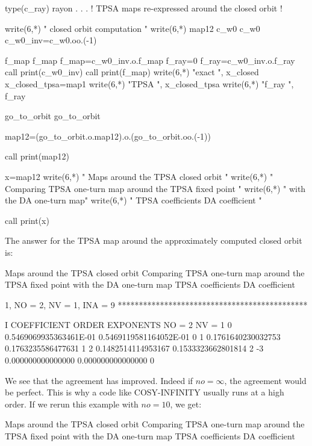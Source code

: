 \documentclass{hitec}     %
\begin{document}
{{{{{{\begin{code}
type(c_ray) rayon
      .
      .
      .
! TPSA maps re-expressed around the closed orbit !

write(6,*) " closed orbit computation "
write(6,*) map12%
c_w0%
c_w0%
c_w0_inv=c_w0.oo.(-1)

f_map%
f_map%
f_map=c_w0_inv.o.f_map
f_ray=0
f_ray=c_w0_inv.o.f_ray
call print(c_w0_inv)
call print(f_map)
write(6,*) "exact ", x_closed
x_closed_tpsa=map1%
write(6,*) "TPSA  ", x_closed_tpsa
write(6,*) "f_ray ", f_ray%

go_to_orbit%
go_to_orbit%

map12=(go_to_orbit.o.map12).o.(go_to_orbit.oo.(-1))

call print(map12)

x=map12%
 write(6,*)  "    Maps around the TPSA closed orbit "
 write(6,*)  "    Comparing TPSA one-turn map around the TPSA fixed point "
write(6,*)  "    with the DA one-turn map"
 write(6,*)  "    TPSA coefficients      DA coefficient "

 call print(x)
 \end{code}

The answer for the TPSA map around the approximately computed closed orbit is:

\begin{code}
      Maps around the TPSA closed orbit
     Comparing TPSA one-turn map around the TPSA fixed point
     with the DA one-turn map
     TPSA coefficients      DA coefficient

          1, NO =    2, NV =    1, INA =    9
 *********************************************

    I  COEFFICIENT          ORDER   EXPONENTS
      NO =     2      NV =     1
   0  0.5469069935363461E-01  0.5469119581164052E-01   0
   1  0.1761640230032753      0.1763235586477631       1
   2  0.1482514114953167      0.1533323662801814       2
    -3   0.000000000000000       0.000000000000000       0
\end{code}
\label{p:tpage}  

We see that the agreement has improved. Indeed if $no=\infty $, the agreement would be perfect. This is why a code like COSY-INFINITY usually runs at a high order.
If  we rerun this example with $no=10$, we get:

\begin{code}
     Maps around the TPSA closed orbit
     Comparing TPSA one-turn map around the TPSA fixed point
     with the DA one-turn map
     TPSA coefficients      DA coefficient


\end{code}}}}}}}
\end{document}
